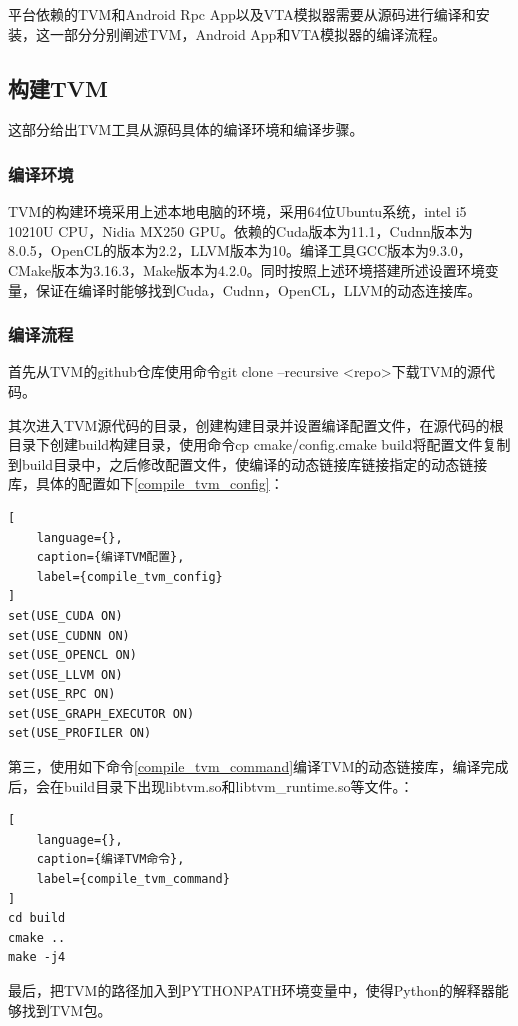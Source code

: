 平台依赖的TVM和Android Rpc App以及VTA模拟器需要从源码进行编译和安装，这一部分分别阐述TVM，Android App和VTA模拟器的编译流程。

\subsection{构建TVM}

这部分给出TVM工具从源码具体的编译环境和编译步骤。


\subsubsection{编译环境}

TVM的构建环境采用上述本地电脑的环境，采用64位Ubuntu系统，intel i5 10210U CPU，Nidia MX250 GPU。依赖的Cuda版本为11.1，Cudnn版本为8.0.5，OpenCL的版本为2.2，LLVM版本为10。编译工具GCC版本为9.3.0，CMake版本为3.16.3，Make版本为4.2.0。同时按照上述环境搭建所述设置环境变量，保证在编译时能够找到Cuda，Cudnn，OpenCL，LLVM的动态连接库。


\subsubsection{编译流程}

首先从TVM的github仓库使用命令git clone --recursive <repo>下载TVM的源代码。

其次进入TVM源代码的目录，创建构建目录并设置编译配置文件，在源代码的根目录下创建build构建目录，使用命令cp cmake/config.cmake build将配置文件复制到build目录中，之后修改配置文件，使编译的动态链接库链接指定的动态链接库，具体的配置如下\ref{compile_tvm_config}：

\begin{lstlisting}[
    language={},
    caption={编译TVM配置},
    label={compile_tvm_config}
]
set(USE_CUDA ON)
set(USE_CUDNN ON)
set(USE_OPENCL ON)
set(USE_LLVM ON)
set(USE_RPC ON)
set(USE_GRAPH_EXECUTOR ON)
set(USE_PROFILER ON)
\end{lstlisting}

第三，使用如下命令\ref{compile_tvm_command}编译TVM的动态链接库，编译完成后，会在build目录下出现libtvm.so和libtvm\_runtime.so等文件。：

\begin{lstlisting}[
    language={},
    caption={编译TVM命令},
    label={compile_tvm_command}
]
cd build
cmake ..
make -j4
\end{lstlisting}

最后，把TVM的路径加入到PYTHONPATH环境变量中，使得Python的解释器能够找到TVM包。


